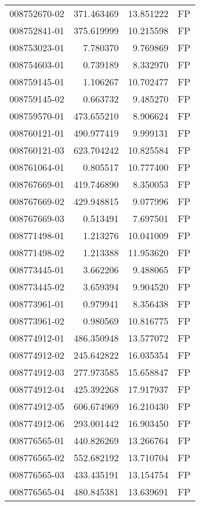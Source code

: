 \begin{tabular}{lrrl}
008752670-02 &  371.463469 &    13.851222 &   FP \\
008752841-01 &  375.619999 &    10.215598 &   FP \\
008753023-01 &    7.780370 &     9.769869 &   FP \\
008754603-01 &    0.739189 &     8.332970 &   FP \\
008759145-01 &    1.106267 &    10.702477 &   FP \\
008759145-02 &    0.663732 &     9.485270 &   FP \\
008759570-01 &  473.655210 &     8.906624 &   FP \\
008760121-01 &  490.977419 &     9.999131 &   FP \\
008760121-03 &  623.704242 &    10.825584 &   FP \\
008761064-01 &    0.805517 &    10.777400 &   FP \\
008767669-01 &  419.746890 &     8.350053 &   FP \\
008767669-02 &  429.948815 &     9.077996 &   FP \\
008767669-03 &    0.513491 &     7.697501 &   FP \\
008771498-01 &    1.213276 &    10.041009 &   FP \\
008771498-02 &    1.213388 &    11.953620 &   FP \\
008773445-01 &    3.662206 &     9.488065 &   FP \\
008773445-02 &    3.659394 &     9.904520 &   FP \\
008773961-01 &    0.979941 &     8.356438 &   FP \\
008773961-02 &    0.980569 &    10.816775 &   FP \\
008774912-01 &  486.350948 &    13.577072 &   FP \\
008774912-02 &  245.642822 &    16.035354 &   FP \\
008774912-03 &  277.973585 &    15.658847 &   FP \\
008774912-04 &  425.392268 &    17.917937 &   FP \\
008774912-05 &  606.674969 &    16.210430 &   FP \\
008774912-06 &  293.001442 &    16.903450 &   FP \\
008776565-01 &  440.826269 &    13.266764 &   FP \\
008776565-02 &  552.682192 &    13.710704 &   FP \\
008776565-03 &  433.435191 &    13.154754 &   FP \\
008776565-04 &  480.845381 &    13.639691 &   FP \\

\end{tabular}
